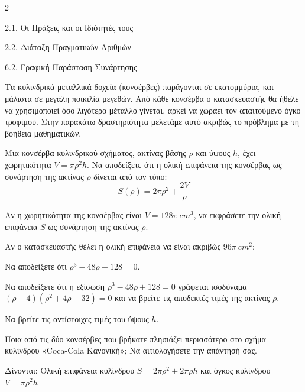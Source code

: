 \begin{ylh}{2}
    \item 2.1. Οι Πράξεις και οι Ιδιότητές τους
    \item 2.2. Διάταξη Πραγματικών Αριθμών
    \item 6.2. Γραφική Παράσταση Συνάρτησης
\end{ylh}
{Τα κυλινδρικά μεταλλικά δοχεία (κονσέρβες) παράγονται σε εκατομμύρια, και μάλιστα σε μεγάλη ποικιλία μεγεθών. Από κάθε κονσέρβα ο κατασκευαστής θα ήθελε να χρησιμοποιεί όσο λιγότερο μέταλλο γίνεται, αρκεί να χωράει τον απαιτούμενο όγκο τροφίμου. Στην παρακάτω δραστηριότητα μελετάμε αυτό ακριβώς το πρόβλημα με τη βοήθεια μαθηματικών.
\begin{alist}
\item Μια κονσέρβα κυλινδρικού σχήματος, ακτίνας βάσης $\rho$ και ύψους $h$, έχει χωρητικότητα $V = \pi\rho^2 h$. Να αποδείξετε ότι η ολική επιφάνεια της κονσέρβας ως συνάρτηση της ακτίνας $\rho$ δίνεται από τον τύπο:
\begin{equation*}S(\rho) = 2\pi\rho^2 + \dfrac{2V}{\rho}\end{equation*}
\item Αν η χωρητικότητα της κονσέρβας είναι $V = 128\pi\ cm^3$, να εκφράσετε την ολική επιφάνεια $S$ ως συνάρτηση της ακτίνας $\rho$.
\item Αν ο κατασκευαστής θέλει η ολική επιφάνεια να είναι ακριβώς $96\pi\ cm^2$:
\begin{rlist}
\item Να αποδείξετε ότι $\rho^3 - 48\rho + 128 = 0$.
\item Να αποδείξετε ότι η εξίσωση $\rho^3 - 48\rho + 128 = 0$ γράφεται ισοδύναμα $(\rho - 4)(\rho^2 + 4\rho - 32) = 0$ και να βρείτε τις αποδεκτές τιμές της ακτίνας $\rho$.
\item Να βρείτε τις αντίστοιχες τιμές του ύψους $h$.
\end{rlist}
\item Ποια από τις δύο κονσέρβες που βρήκατε πλησιάζει περισσότερο στο σχήμα κυλίνδρου «Coca-Cola Κανονική»; Να αιτιολογήσετε την απάντησή σας.

Δίνονται: Ολική επιφάνεια κυλίνδρου $S = 2\pi\rho^{2} + 2\pi\rho h$ και όγκος κυλίνδρου $V = \pi\rho^{2}h$
\end{alist}}

